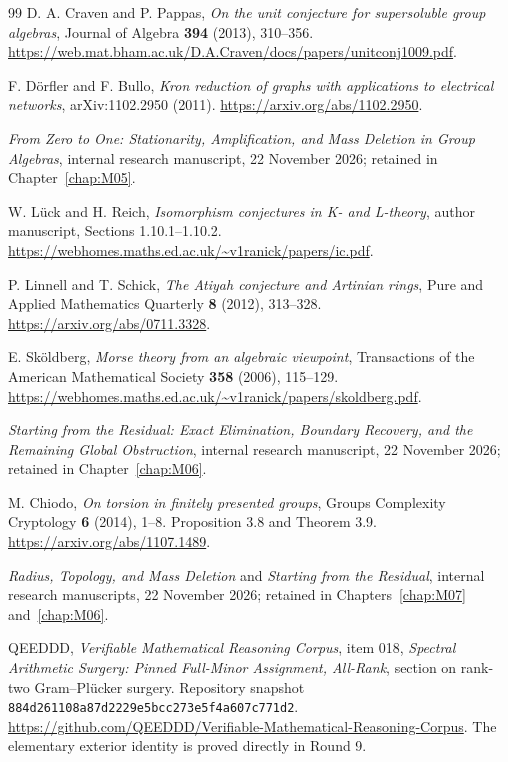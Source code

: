 \documentclass[11pt,a4paper,oneside]{report}
\theoremstyle{definition}
\theoremstyle{remark}
\begin{document}
\begin{thebibliography}{99}
D. A. Craven and P. Pappas,
\emph{On the unit conjecture for supersoluble group algebras},
Journal of Algebra \textbf{394} (2013), 310--356.
\url{https://web.mat.bham.ac.uk/D.A.Craven/docs/papers/unitconj1009.pdf}.

F. D\"orfler and F. Bullo,
\emph{Kron reduction of graphs with applications to electrical networks},
arXiv:1102.2950 (2011).
\url{https://arxiv.org/abs/1102.2950}.

\emph{From Zero to One: Stationarity, Amplification,
and Mass Deletion in Group Algebras}, internal research manuscript,
22 November 2026; retained in Chapter~\ref{chap:M05}.

W. L\"uck and H. Reich,
\emph{Isomorphism conjectures in K- and L-theory},
author manuscript, Sections 1.10.1--1.10.2.
\url{https://webhomes.maths.ed.ac.uk/~v1ranick/papers/ic.pdf}.

P. Linnell and T. Schick,
\emph{The Atiyah conjecture and Artinian rings},
Pure and Applied Mathematics Quarterly \textbf{8} (2012),
313--328. \url{https://arxiv.org/abs/0711.3328}.

E. Sk\"oldberg, \emph{Morse theory from an algebraic viewpoint},
Transactions of the American Mathematical Society
\textbf{358} (2006), 115--129.
\url{https://webhomes.maths.ed.ac.uk/~v1ranick/papers/skoldberg.pdf}.

\emph{Starting from the Residual: Exact
Elimination, Boundary Recovery, and the Remaining Global Obstruction},
internal research manuscript, 22 November 2026; retained in
Chapter~\ref{chap:M06}.

M. Chiodo, \emph{On torsion in finitely presented groups},
Groups Complexity Cryptology \textbf{6} (2014), 1--8.
Proposition 3.8 and Theorem 3.9.
\url{https://arxiv.org/abs/1107.1489}.

\emph{Radius, Topology, and Mass Deletion}
and \emph{Starting from the Residual}, internal research manuscripts,
22 November 2026; retained in Chapters~\ref{chap:M07} and~\ref{chap:M06}.

QEEDDD, \emph{Verifiable Mathematical Reasoning Corpus}, item 018,
\emph{Spectral Arithmetic Surgery: Pinned Full-Minor Assignment,
All-Rank}, section on rank-two Gram--Pl\"ucker surgery.
Repository snapshot \texttt{884d261108a87d2229e5bcc273e5f4a607c771d2}.
\url{https://github.com/QEEDDD/Verifiable-Mathematical-Reasoning-Corpus}.
The elementary exterior identity is proved directly in Round 9.


\end{thebibliography}
\end{document}
